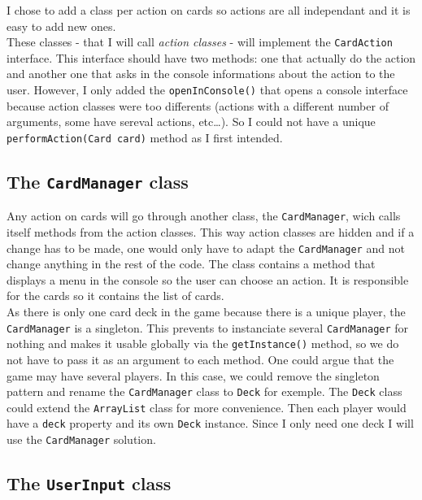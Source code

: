 \documentclass{article}
\begin{document}
I chose to add a class per action on cards so actions are all
independant and it is easy to add new ones.\\

\noindent
These classes - that I will call \textit{action classes} - will implement the
\texttt{CardAction} interface. This interface should have two methods:
one that actually do the action and another one that asks in the console
informations about the action to the user. However, I only added the
\texttt{openInConsole()} that opens a console interface because action classes
were too differents (actions with a different number of arguments, some have
sereval actions, etc\ldots{}). So I could not have a unique
\texttt{performAction(Card card)} method as I first intended.

\subsection{The \texttt{CardManager} class}

Any action on cards will go through another class, the
\texttt{CardManager}, wich calls itself methods from the action classes.
This way action classes are hidden and if a change has to be made, one
would only have to adapt the \texttt{CardManager} and not change
anything in the rest of the code. The class contains a method that
displays a menu in the console so the user can choose an action. It is
responsible for the cards so it contains the list of cards.\\

\noindent 
As there is only one card deck in the game because there is a unique
player, the \texttt{CardManager} is a singleton. This prevents to
instanciate several \texttt{CardManager} for nothing and makes it usable
globally via the \texttt{getInstance()} method, so we do not have to
pass it as an argument to each method. One could argue that the game may
have several players. In this case, we could remove the singleton
pattern and rename the \texttt{CardManager} class to \texttt{Deck} for
exemple. The \texttt{Deck} class could extend the \texttt{ArrayList}
class for more convenience. Then each player would have a \texttt{deck}
property and its own \texttt{Deck} instance. Since I only need one deck
I will use the \texttt{CardManager} solution.

\subsection{The \texttt{UserInput} class}
\end{document}
